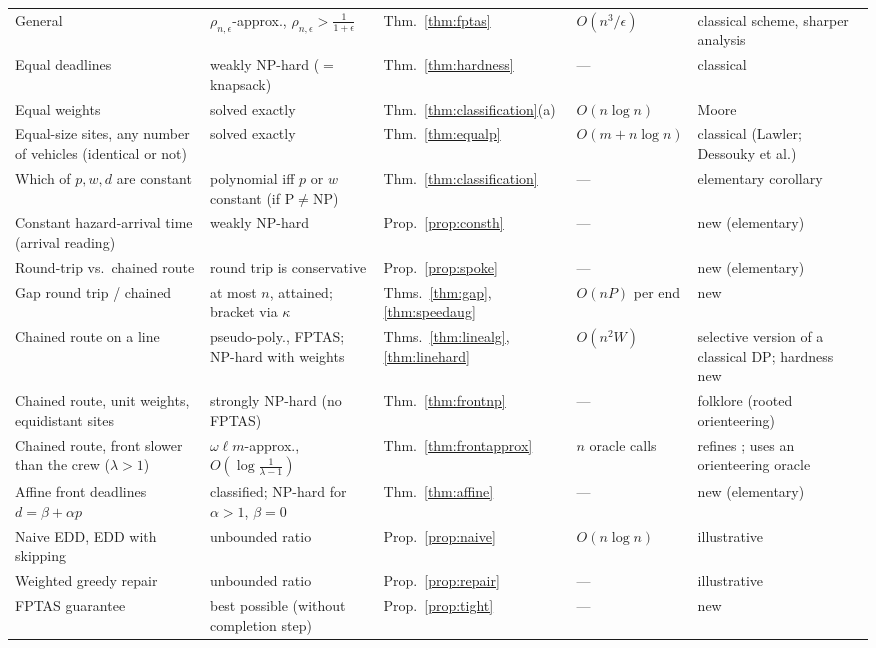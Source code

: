 \documentclass[pdflatex,sn-mathphys-ay]{sn-jnl}
\theoremstyle{thmstyleone}
\theoremstyle{thmstyletwo}
\theoremstyle{thmstylethree}
\providecommand{\DIFaddendFL}{} %
\DeclareRobustCommand{\DIFaddendFL}{\DIFOaddendFL \let\includegraphics\DIFOincludegraphics} %
\begin{document}
\begin{table}[h]
\begin{tabular}{@{}p{2.4cm}p{2.5cm}p{1.6cm}p{1.5cm}p{1.75cm}@{}}
General & $\rho_{n,\epsilon}$-approx., $\rho_{n,\epsilon}>\frac{1}{1+\epsilon}$ & Thm.~\ref{thm:fptas} & $O(n^3/\epsilon)$ & classical scheme, sharper analysis \\
Equal deadlines & weakly NP-hard ($=$ knapsack) & Thm.~\ref{thm:hardness} & --- & classical \\
Equal weights & solved exactly & Thm.~\ref{thm:classification}(a) & $O(n\log n)$ & Moore \\
Equal-size sites, any number of vehicles (identical or not) & solved exactly & Thm.~\ref{thm:equalp} & $O(m+n\log n)$ & classical (Lawler; Dessouky et al.) \\
Which of $p,w,d$ are constant & polynomial iff $p$ or $w$ constant (if P$\ne$NP) & Thm.~\ref{thm:classification} & --- & elementary corollary \\
Constant hazard-arrival time (arrival reading) & weakly NP-hard & Prop.~\ref{prop:consth} & --- & new (elementary) \\
Round-trip vs.\ chained route & round trip is conservative & Prop.~\ref{prop:spoke} & --- & new (elementary) \\
Gap round trip / chained & at most $n$, attained; bracket via $\kappa$ & Thms.~\ref{thm:gap}, \ref{thm:speedaug} & $O(nP)$ per end & new \\
Chained route on a line & pseudo-poly., FPTAS; NP-hard with weights & Thms.~\ref{thm:linealg}, \ref{thm:linehard} & $O(n^2W)$ & selective version of a classical DP; hardness new \\
Chained route, unit weights, equidistant sites & strongly NP-hard (no FPTAS) & Thm.~\ref{thm:frontnp} & --- & folklore (rooted orienteering) \\
Chained route, front slower than the crew ($\lambda>1$) & $\omega\ell m$-approx., $O(\log\frac{1}{\lambda-1})$ & Thm.~\ref{thm:frontapprox} & $n$ oracle calls & refines \citet{bansal2004}; uses an orienteering oracle \\
Affine front deadlines $d=\beta+\alpha p$ & classified; NP-hard for $\alpha>1$, $\beta=0$ & Thm.~\ref{thm:affine} & --- & new (elementary) \\
Naive EDD, EDD with skipping & unbounded ratio & Prop.~\ref{prop:naive} & $O(n\log n)$ & illustrative \\
Weighted greedy repair & unbounded ratio & Prop.~\ref{prop:repair} & --- & illustrative \\
FPTAS guarantee & best possible (without completion step) & Prop.~\ref{prop:tight} & --- & new \\
\bottomrule
\end{tabular}
\DIFaddendFL \end{table}
\end{document}
